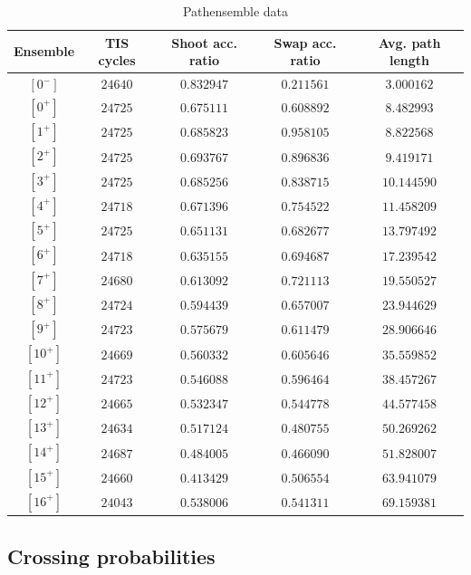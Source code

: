 \documentclass[a4paper]{article}
\begin{document}
\begin{longtable}{| c | c | c | c | c |}
\caption{Pathensemble data}\\
\hline
Ensemble & TIS cycles & Shoot acc. ratio & Swap acc. ratio & Avg. path length\\ \hline
$ [0^-]  $ & $  24640   $ & $ 0.832947 $ & $ 0.211561 $ & $ 3.000162 $\\
$ [0^+]  $ & $  24725   $ & $ 0.675111 $ & $ 0.608892 $ & $ 8.482993 $\\
$ [1^+]  $ & $  24725   $ & $ 0.685823 $ & $ 0.958105 $ & $ 8.822568 $\\
$ [2^+]  $ & $  24725   $ & $ 0.693767 $ & $ 0.896836 $ & $ 9.419171 $\\
$ [3^+]  $ & $  24725   $ & $ 0.685256 $ & $ 0.838715 $ & $10.144590 $\\
$ [4^+]  $ & $  24718   $ & $ 0.671396 $ & $ 0.754522 $ & $11.458209 $\\
$ [5^+]  $ & $  24725   $ & $ 0.651131 $ & $ 0.682677 $ & $13.797492 $\\
$ [6^+]  $ & $  24718   $ & $ 0.635155 $ & $ 0.694687 $ & $17.239542 $\\
$ [7^+]  $ & $  24680   $ & $ 0.613092 $ & $ 0.721113 $ & $19.550527 $\\
$ [8^+]  $ & $  24724   $ & $ 0.594439 $ & $ 0.657007 $ & $23.944629 $\\
$ [9^+]  $ & $  24723   $ & $ 0.575679 $ & $ 0.611479 $ & $28.906646 $\\
$ [10^+] $ & $  24669   $ & $ 0.560332 $ & $ 0.605646 $ & $35.559852 $\\
$ [11^+] $ & $  24723   $ & $ 0.546088 $ & $ 0.596464 $ & $38.457267 $\\
$ [12^+] $ & $  24665   $ & $ 0.532347 $ & $ 0.544778 $ & $44.577458 $\\
$ [13^+] $ & $  24634   $ & $ 0.517124 $ & $ 0.480755 $ & $50.269262 $\\
$ [14^+] $ & $  24687   $ & $ 0.484005 $ & $ 0.466090 $ & $51.828007 $\\
$ [15^+] $ & $  24660   $ & $ 0.413429 $ & $ 0.506554 $ & $63.941079 $\\
$ [16^+] $ & $  24043   $ & $ 0.538006 $ & $ 0.541311 $ & $69.159381 $\\
\hline
\end{longtable}
\clearpage


\subsection{Crossing probabilities}
\end{document}
